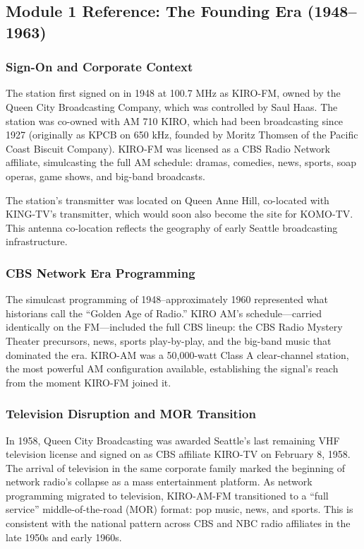 \documentclass[11pt,letterpaper]{article}
\begin{document}
\subsection{Module 1 Reference: The Founding Era (1948--1963)}

\subsubsection{Sign-On and Corporate Context}

The station first signed on in 1948 at 100.7 MHz as KIRO-FM, owned by the Queen City Broadcasting Company, which was controlled by Saul Haas. The station was co-owned with AM 710 KIRO, which had been broadcasting since 1927 (originally as KPCB on 650 kHz, founded by Moritz Thomsen of the Pacific Coast Biscuit Company). KIRO-FM was licensed as a CBS Radio Network affiliate, simulcasting the full AM schedule: dramas, comedies, news, sports, soap operas, game shows, and big-band broadcasts.

The station's transmitter was located on Queen Anne Hill, co-located with KING-TV's transmitter, which would soon also become the site for KOMO-TV. This antenna co-location reflects the geography of early Seattle broadcasting infrastructure.

\subsubsection{CBS Network Era Programming}

The simulcast programming of 1948--approximately 1960 represented what historians call the ``Golden Age of Radio.'' KIRO AM's schedule---carried identically on the FM---included the full CBS lineup: the CBS Radio Mystery Theater precursors, news, sports play-by-play, and the big-band music that dominated the era. KIRO-AM was a 50,000-watt Class A clear-channel station, the most powerful AM configuration available, establishing the signal's reach from the moment KIRO-FM joined it.

\subsubsection{Television Disruption and MOR Transition}

In 1958, Queen City Broadcasting was awarded Seattle's last remaining VHF television license and signed on as CBS affiliate KIRO-TV on February 8, 1958. The arrival of television in the same corporate family marked the beginning of network radio's collapse as a mass entertainment platform. As network programming migrated to television, KIRO-AM-FM transitioned to a ``full service'' middle-of-the-road (MOR) format: pop music, news, and sports. This is consistent with the national pattern across CBS and NBC radio affiliates in the late 1950s and early 1960s.
\end{document}

